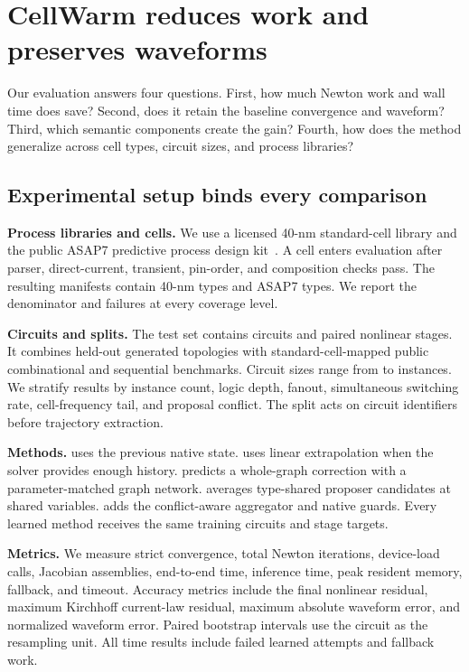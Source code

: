 \section{CellWarm reduces work and preserves waveforms}
\label{sec:evaluation}

Our evaluation answers four questions. First, how much Newton work and wall time does \system{} save? Second, does it retain the baseline convergence and waveform? Third, which semantic components create the gain? Fourth, how does the method generalize across cell types, circuit sizes, and process libraries?

\subsection{Experimental setup binds every comparison}

\noindent\textbf{Process libraries and cells.}
We use a licensed 40-nm standard-cell library and the public ASAP7 predictive process design kit~\cite{clark2016asap7}. A cell enters evaluation after parser, direct-current, transient, pin-order, and composition checks pass. The resulting manifests contain \NumFortyCellTypes{} 40-nm types and \NumSevenCellTypes{} ASAP7 types. We report the denominator and failures at every coverage level.

\noindent\textbf{Circuits and splits.}
The test set contains \NumTestCircuits{} circuits and \NumTestStages{} paired nonlinear stages. It combines held-out generated topologies with standard-cell-mapped public combinational and sequential benchmarks. Circuit sizes range from \MinTestInstances{} to \MaxTestInstances{} instances. We stratify results by instance count, logic depth, fanout, simultaneous switching rate, cell-frequency tail, and proposal conflict. The \TrainValidationTestSplit{} split acts on circuit identifiers before trajectory extraction.

\noindent\textbf{Methods.}
 uses the previous native state.  uses linear extrapolation when the solver provides enough history.  predicts a whole-graph correction with a parameter-matched graph network.  averages type-shared proposer candidates at shared variables. \system{} adds the conflict-aware aggregator and native guards. Every learned method receives the same training circuits and stage targets.

\noindent\textbf{Metrics.}
We measure strict convergence, total Newton iterations, device-load calls, Jacobian assemblies, end-to-end time, inference time, peak resident memory, fallback, and timeout. Accuracy metrics include the final nonlinear residual, maximum Kirchhoff current-law residual, maximum absolute waveform error, and normalized waveform error. Paired bootstrap intervals use the circuit as the resampling unit. All time results include failed learned attempts and fallback work.

